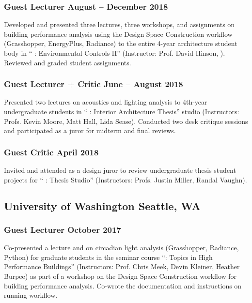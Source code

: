 \documentclass[letterpaper, oneside, 10pt]{article}
\begin{document}
\subsubsection*{Guest Lecturer\DotSep{0.25em} August -- December 2018}

Developed and presented three lectures, three workshops, and assignments on
building performance analysis using the Design Space Construction workflow
(Grasshopper, EnergyPlus, Radiance) to the entire 4-year architecture
student body in `` : Environmental Controls II” (Instructor:
Prof. David Hinson, ). Reviewed and graded student assignments.


\subsubsection*{Guest Lecturer + Critic\DotSep{0.25em} June – August 2018}

Presented two lectures on acoustics and lighting analysis to 4th-year
undergraduate students in `` : Interior Architecture
Thesis'' studio (Instructors: Profs. Kevin Moore, Matt Hall, Lida Sease).
Conducted two desk critique sessions and participated as a juror for midterm
and final reviews.


\subsubsection*{Guest Critic\DotSep{0.25em} April 2018}

Invited and attended as a design juror to review undergraduate thesis student
projects for `` : Thesis Studio'' (Instructors: Profs. Justin
Miller, Randal Vaughn).

\subsection*{University of Washington\DotSep{0.25em} Seattle, WA}

\subsubsection*{Guest Lecturer\DotSep{0.25em} October 2017}

Co-presented a lecture and on circadian light analysis (Grasshopper, Radiance,
Python) for graduate students in the seminar course ``:
Topics in High Performance Buildings'' (Instructors: Prof. Chris Meek, Devin
Kleiner, Heather Burpee) as part of a workshop on the Design Space
Construction  workflow for building performance analysis. Co-wrote
the documentation and instructions on running  workflow.
\end{document}

